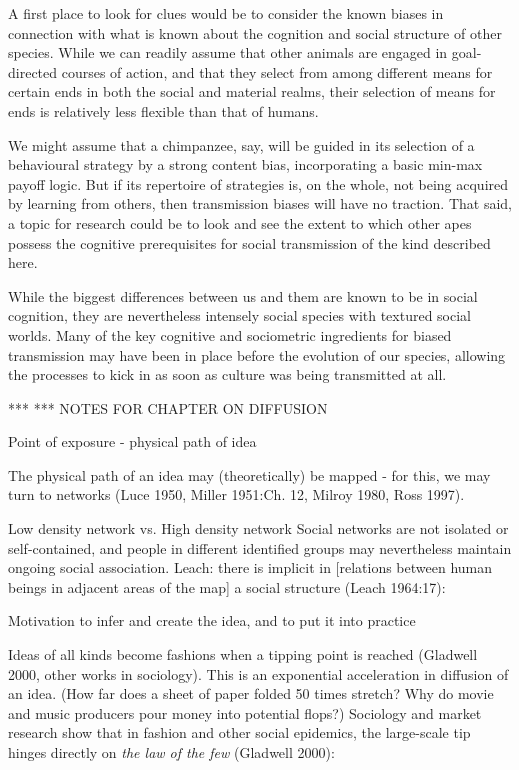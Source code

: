 A first place to look for clues would be to consider the known biases in 
connection with what is known about the cognition and social structure 
of other species. While we can readily assume that other animals are 
engaged in goal-directed courses of action, and that they select from 
among different means for certain ends in both the social and material 
realms, their selection of means for ends is relatively less flexible 
than that of humans. 



We might assume that a chimpanzee, say, will be guided in its selection 
of a behavioural strategy by a strong content bias, incorporating a 
basic min-max payoff logic. But if its repertoire of strategies is, on 
the whole, not being acquired by learning from others, then transmission 
biases will have no traction. That said, a topic for research could be 
to look and see the extent to which other apes possess the cognitive 
prerequisites for social transmission of the kind described here. 



While the biggest differences between us and them are known to be in 
social cognition, they are nevertheless intensely social species with 
textured social worlds. Many of the key cognitive and sociometric 
ingredients for biased transmission may have been in place before the 
evolution of our species, allowing the processes to kick in as soon as 
culture was being transmitted at all. 




***
***
NOTES FOR CHAPTER ON DIFFUSION

Point of exposure - physical path of idea 

The physical path of an idea may (theoretically) be mapped - for this, we may turn to networks (Luce 1950, Miller 1951:Ch. 12, Milroy 1980, Ross 1997).

Low density network vs. High density network
	Social networks are not isolated or self-contained, and people in different identified groups may nevertheless maintain ongoing social association. Leach: there is implicit in [relations between human beings in adjacent areas of the map] a social structure (Leach 1964:17):


Motivation to infer and create the idea, and to put it into practice

Ideas of all kinds become fashions when a tipping point is reached (Gladwell 2000, other works in sociology). This is an exponential acceleration in diffusion of an idea. (How far does a sheet of paper folded 50 times stretch? Why do movie and music producers pour money into potential flops?) Sociology and market research show that in fashion and other social epidemics, the large-scale tip hinges directly on \textit{the law of the few} (Gladwell 2000): 

